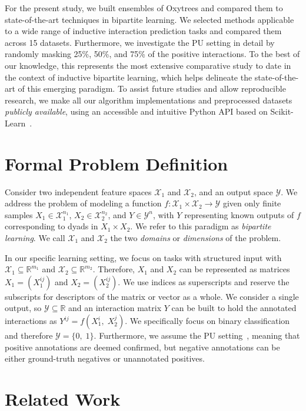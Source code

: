 \documentclass[letterpaper]{article}
\newcommand{\X}{\mathcal{X}}
\newcommand{\Y}{\mathcal{Y}}
\newcommand{\R}{\mathbb{R}}
\begin{document}
For the present study, we built ensembles of Oxytrees and compared them to state-of-the-art techniques in bipartite learning. We selected methods applicable to a wide range of inductive interaction prediction tasks and compared them across 15 datasets.
Furthermore, we investigate the PU setting in detail by randomly masking 25\%, 50\%, and 75\% of the positive interactions.
To the best of our knowledge, this represents the most extensive comparative study to date in the context of inductive bipartite learning, which helps delineate the state-of-the-art of this emerging paradigm.
To assist future studies and allow reproducible research, we make all our algorithm implementations and preprocessed datasets \emph{publicly available},
using an accessible and intuitive Python API based on Scikit-Learn~\cite{pedregosa_scikit-learn_2011}.


\section{Formal Problem Definition}
\label{sec:background}


Consider two independent feature spaces $\X_1$ and $\X_2$, and an output space $\Y$.
We address the problem of modeling a function $f \colon \X_1 \times \X_2 \to \Y$ given only finite samples $X_1 \in \X_1^{n_1}$, $X_2 \in \X_2^{n_2}$, and $Y\in \Y^n$, with $Y$ representing known outputs of $f$ corresponding to dyads in $X_1 \times X_2$.
We refer to this paradigm as \emph{bipartite learning}.
We call $\X_1$ and $\X_2$ the two \emph{domains} or \emph{dimensions} of the problem.

In our specific learning setting, we focus on tasks with structured input with $\X_1 \subseteq \R^{m_1}$ and $\X_2 \subseteq \R^{m_2}$. Therefore, $X_1$ and $X_2$ can be represented as matrices $X_1=(X_1^{ij})$ and $X_2=(X_2^{ij})$. We use indices as superscripts and reserve the subscripts for descriptors of the matrix or vector as a whole.
We consider a single output, so $\Y \subseteq \R$ and an interaction matrix $Y$ can be built to hold the annotated interactions as $Y^{ij} = f(X_1^i,\; X_2^j)$.
We specifically focus on binary classification and therefore $\Y=\{0,\;1\}$. Furthermore, we assume the PU setting~\cite{bekker2020learning}, meaning that positive annotations are deemed confirmed, but negative annotations can be either ground-truth negatives or unannotated positives.


\section{Related Work}
\label{sec:related work}
\end{document}
